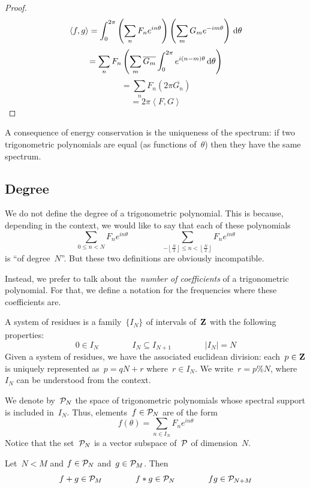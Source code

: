 \begin{proof}
	$$\left<f,g\right>=\int_0^{2\pi}
	\left(\sum_nF_ne^{in\theta}\right)
	\left(\sum_mG_me^{-im\theta}\right)
	\,\mathrm{d}\theta
	$$
	$$=\sum_nF_n\left(\sum_m\overline{G_m}\int_0^{2\pi}e^{i(n-m)\theta}
	\,\mathrm{d}\theta
	\right)
	$$
	$$=\sum_nF_n\left(2\pi\overline{G_n}\right)$$
	$$=2\pi\left<F,G\right>$$
\end{proof}

A consequence of energy conservation is the uniqueness of the spectrum: if
two trigonometric polynomials are equal (as functions of~$\theta$) then they
have the same spectrum.


\subsection{Degree}

We do not define the degree of a trigonometric polynomial.  This is because,
depending in the context, we would like to say that each of these polynomials
$$\sum_{0\le n<N}
F_ne^{in\theta}
\qquad
\qquad
\sum
_{-\left\lfloor\frac{N}{2}\right\rfloor\le n<\left\lfloor\frac{N}{2}\right\rfloor}
F_ne^{in\theta}
$$
is ``of degree~$N$''.  But these two definitions are obviously incompatible.

Instead, we prefer to talk about the~\emph{number of coefficients} of
a trigonometric polynomial.  For that, we define a notation for the
frequencies where these coefficients are.

\begin{definition}
	A system of residues is a family~$\{I_N\}_{}$ of intervals of~$\mathbf{Z}$ with
	the following properties:
	$$
	0\in I_N
	\qquad
	\qquad
	I_N\subseteq I_{N+1}
	\qquad
	\qquad
	|I_N|=N
	$$
	Given a system of residues, we have the associated euclidean division:
	each~$p\in\mathbf{Z}$ is uniquely represented as~$p=qN+r$ where~$r\in I_N$.  We
	write~$r=p\%N$, where~$I_N$ can be understood from the context.
\end{definition}

\begin{definition}
	We denote by~$\mathcal{P}_N$ the space of trigonometric polynomials whose spectral
	support is included in~$I_N$.  Thus, elements~$f\in\mathcal{P}_N$ are of the form
	$$f(\theta)=\sum_{n\in I_N}F_ne^{in\theta}$$
	Notice that the set~$\mathcal{P}_N$ is a vector subspace of~$\mathcal{P}$ of dimension~$N$.
\end{definition}

\begin{proposition}
	Let~$N<M$ and $f\in\mathcal{P}_N$ and~$g\in\mathcal{P}_M$.  Then
	$$f+g\in\mathcal{P}_M
	\qquad\qquad
	f*g\in\mathcal{P}_N
	\qquad\qquad
	fg\in\mathcal{P}_{N+M}
	$$
\end{proposition}

